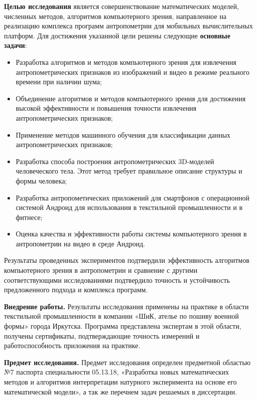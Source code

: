 \textbf{Целью исследования} является совершенствование математических моделей, численных методов, алгоритмов компьютерного зрения, направленное на реализацию комплекса программ антропометрии для мобильных вычислительных платформ.  Для достижения указанной цели решены следующие \textbf {основные задачи}:
\begin{itemize}
	\item Разработка алгоритмов и методов компьютерного зрения для извлечения антропометрических признаков из изображений и видео в режиме реального времени при наличии шума;
	\item Объединение алгоритмов и методов компьютерного зрения для достижения высокой эффективности и повышения точности извлечения антропометрических признаков;
	\item Применение методов машинного обучения для классификации данных антропометрических признаков;
	\item Разработка способа построения антропометрических 3D-моделей человеческого тела. Этот метод требует правильное описание структуры и формы человека;
	\item Разработка антропометических приложений для смартфонов с операционной системой Андроид для использования в текстильной промышленности и в фитнесе;
	\item Оценка качества и эффективности работы системы компьютерного зрения в антропометрии на видео в среде Андроид.
\end{itemize}
Результаты проведенных экспериментов подтвердили эффективность алгоритмов компьютерного зрения в антропометрии и сравнение с другими соответствующими исследованиями подтвердило точность и устойчивость предложенного подхода и комплекса программ.

\textbf{Внедрение работы.} Результаты исследования применены на практике в области текстильной промышленности в компании «ШиК, ателье по пошиву военной формы» города Иркутска. Программа представлена экспертам в этой области, получены сертификаты, подтверждающие точность измерений и работоспособность приложения на практике.

\textbf{Предмет исследования.} Предмет исследования определен предметной областью №7 паспорта специальности 05.13.18, «Разработка новых математических методов и алгоритмов интерпретации натурного эксперимента на основе его математической модели», а так же перечнем задач решаемых в диссертации.

